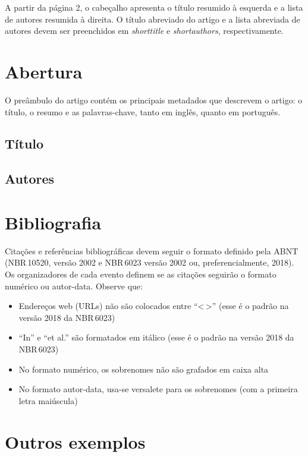 \documentclass[english,notblind]{sbc20}
\begin{document}
A partir da página 2, o cabeçalho apresenta o título resumido à esquerda e a lista de autores resumida à direita. O título abreviado do artigo e a lista abreviada de autores devem ser preenchidos em \textit{shorttitle} e \textit{shortauthors}, respectivamente.

\section{Abertura}

O preâmbulo do artigo contém os principais metadados que descrevem o artigo: o título, o resumo e as palavras-chave, tanto em inglês, quanto em português.

\subsection{Título}

\subsection{Autores}

\section{Bibliografia}

Citações e referências bibliográficas devem seguir o formato definido pela ABNT (NBR\,10520, versão 2002 e NBR\,6023 versão 2002 ou, preferencialmente, 2018). Os organizadores de cada evento definem se as citações seguirão o formato numérico ou autor-data. Observe que:

\begin{itemize}
  \item Endereços web (URLs) não são colocados entre ``<\,>'' (esse é o padrão na versão 2018 da NBR\,6023)
  \item ``In'' e ``et al.'' são formatados em itálico (esse é o padrão na versão 2018 da NBR\,6023)
  \item No formato numérico, os sobrenomes não são grafados em caixa alta
  \item No formato autor-data, usa-se versalete para os sobrenomes (com a primeira letra maiúscula)
\end{itemize}

\section{Outros exemplos}
\end{document}
